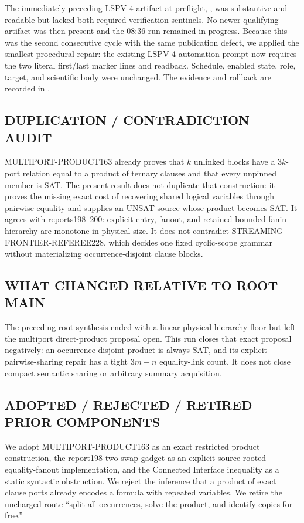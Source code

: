\documentclass[11pt]{article}
\begin{document}
The immediately preceding LSPV-4 artifact at preflight,
,
was substantive and readable but lacked both required verification sentinels.
No newer qualifying artifact was then present and the 08:36 run remained in
progress.  Because this was the second consecutive cycle with the same
publication defect, we applied the smallest procedural repair: the existing
LSPV-4 automation prompt now requires the two literal first/last marker lines
and readback.  Schedule, enabled state, role, target, and scientific body were
unchanged.  The evidence and rollback are recorded in
.

\subsection*{DUPLICATION / CONTRADICTION AUDIT}
MULTIPORT-PRODUCT163 already proves that $k$ unlinked blocks have a $3k$-port
relation equal to a product of ternary clauses and that every unpinned member
is SAT.  The present result does not duplicate that construction: it proves
the missing exact cost of recovering shared logical variables through
pairwise equality and supplies an UNSAT source whose product becomes SAT.
It agrees with reports198--200: explicit entry, fanout, and retained
bounded-fanin hierarchy are monotone in physical size.  It does not contradict
STREAMING-FRONTIER-REFEREE228, which decides one fixed cyclic-scope grammar
without materializing occurrence-disjoint clause blocks.

\subsection*{WHAT CHANGED RELATIVE TO ROOT MAIN}
The preceding root synthesis ended with a linear physical hierarchy floor but
left the multiport direct-product proposal open.  This run closes that exact
proposal negatively: an occurrence-disjoint product is always SAT, and its
explicit pairwise-sharing repair has a tight $3m-n$ equality-link count.  It
does not close compact semantic sharing or arbitrary summary acquisition.

\subsection*{ADOPTED / REJECTED / RETIRED PRIOR COMPONENTS}
We adopt MULTIPORT-PRODUCT163 as an exact restricted product construction,
the report198 two-swap gadget as an explicit source-rooted equality-fanout
implementation, and the
Connected Interface inequality as a static syntactic obstruction.  We reject
the inference that a product of exact clause ports already encodes a formula
with repeated variables.  We retire the uncharged route ``split all
occurrences, solve the product, and identify copies for free.''
\end{document}

